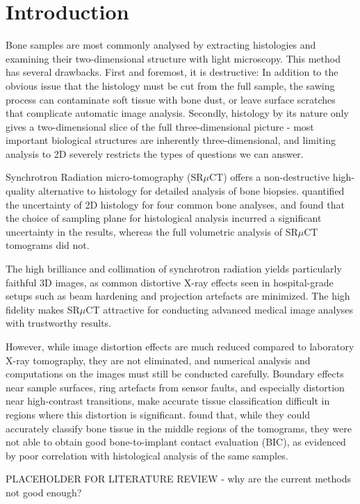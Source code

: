 \section{Introduction}
\label{sec:intro}

Bone samples are most commonly analysed by extracting histologies and examining
their two-dimensional structure with light microscopy. This method has several
drawbacks. First and foremost, it is destructive: In addition to the obvious
issue that the histology must be cut from the full sample, the sawing process
can contaminate soft tissue with bone dust, or leave surface scratches that
complicate automatic image analysis. Secondly, histology by its nature only
gives a two-dimensional slice of the full three-dimensional picture - most
important biological structures are inherently three-dimensional, and limiting
analysis to 2D severely restricts the types of questions we can answer.

Synchrotron Radiation micro-tomography (SR$\mu$CT) offers a non-destructive
high-quality alternative to histology for detailed analysis of bone biopsies.
\cite{torsten2018} quantified the uncertainty of 2D histology for four common
bone analyses, and found that the choice of sampling plane for histological
analysis incurred a significant uncertainty in the results, whereas the full
volumetric analysis of SR$\mu$CT tomograms did not.

The high brilliance and collimation of synchrotron radiation yields
particularly faithful 3D images, as common distortive X-ray effects seen in
hospital-grade setups such as beam hardening and projection artefacts are
minimized. The high fidelity makes SR$\mu$CT attractive for conducting advanced
medical image analyses with trustworthy results.

However, while image distortion effects are much reduced compared to laboratory
X-ray tomography, they are not eliminated, and numerical analysis and
computations on the images must still be conducted carefully. Boundary effects
near sample surfaces, ring artefacts from sensor faults, and especially
distortion near high-contrast transitions, make accurate tissue classification
difficult in regions where this distortion is significant. \cite{sporring}
found that, while they could accurately classify bone tissue in the middle
regions of the tomograms, they were not able to obtain good bone-to-implant
contact evaluation (BIC), as evidenced by poor correlation with histological
analysis of the same samples.

PLACEHOLDER FOR LITERATURE REVIEW - why are the current methods not good
enough?

